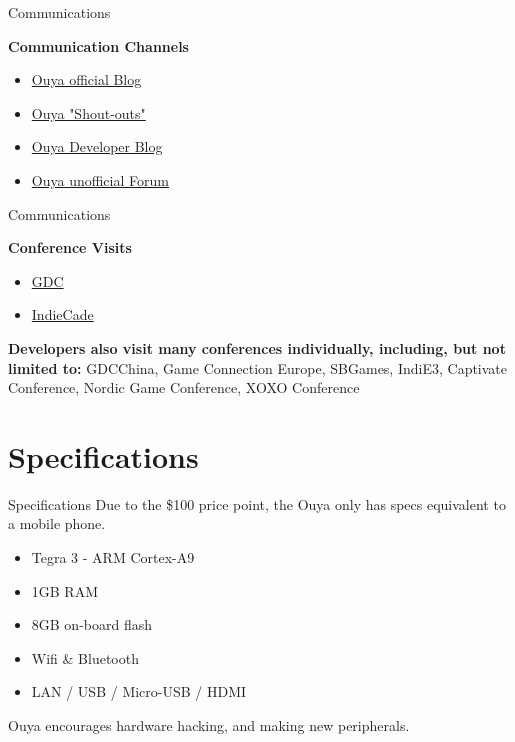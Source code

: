 \documentclass[10pt, compress]{beamer}
\begin{document}
\begin{frame}{Communications}

\textbf{Communication Channels}
\begin{itemize}
\item \href{https://www.ouya.tv/blog/}{\alert{Ouya official Blog}}
\item \href{https://www.ouya.tv/shout-outs/}{\alert{Ouya "Shout-outs"}}
\item \href{https://forums.ouya.tv/}{\alert{Ouya Developer Blog}}
\item \href{http://ouyaforum.com/}{\alert{Ouya unofficial Forum}}
\end{itemize}

\end{frame}

\begin{frame}{Communications}

\textbf{Conference Visits}
\begin{itemize}
\item \href{https://www.ouya.tv/gdc2014/}{\alert{GDC}}
\item \href{https://www.ouya.tv/indiecade2014/}{\alert{IndieCade}}
\end{itemize}
\textbf{Developers also visit many conferences individually, including, but not limited to:}
GDCChina, Game Connection Europe, SBGames, IndiE3, Captivate Conference, Nordic Game Conference, XOXO Conference


\end{frame}

\section{Specifications}

\begin{frame}{Specifications}
    Due to the \$100 price point, the Ouya only has specs equivalent to a mobile phone.
    \vspace{4mm}
    
    \begin{itemize}
    \item Tegra 3 - ARM Cortex-A9
    \item 1GB RAM
    \item 8GB on-board flash
    \item Wifi \& Bluetooth
    \item LAN / USB / Micro-USB / HDMI
    \end{itemize}
    
    \vspace{4mm}
    Ouya encourages hardware hacking, and making new peripherals.
\end{frame}
\end{document}

